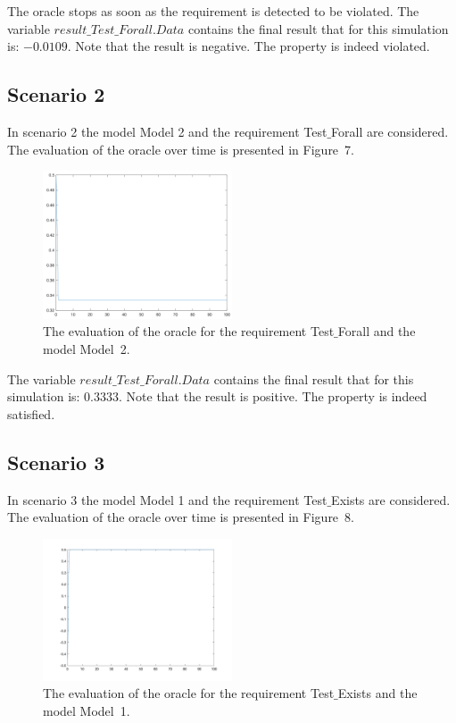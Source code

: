 \documentclass[12pt]{extarticle}
\newcommand{\<}{\langle}
\renewcommand{\>}{\rangle}
\theoremstyle{definition}
\begin{document}
The oracle stops as soon as the requirement is detected to be violated.
The variable  $result\_Test\_Forall.Data$  contains the final result that for this simulation is: $-0.0109$.
Note that the result is negative. 
The property is indeed violated.

\subsection{Scenario 2}
In scenario 2 the model Model 2 and the requirement Test$\_$Forall are considered. 
The evaluation of the oracle over time is presented in Figure~7.

\begin{figure}[h]
\caption{The evaluation of the oracle for the requirement Test$\_$Forall  and the model Model~2.}
  \centering
    \includegraphics[width=0.5\textwidth]{Manual/resModel2TestForall.png}
\end{figure}

The variable $result\_Test\_Forall.Data$ contains the final result that for this simulation is: $0.3333$.
Note that the result is positive.
The property is indeed satisfied.


\subsection{Scenario 3}
In scenario 3 the model Model 1 and the requirement Test$\_$Exists are considered. 
The evaluation of the oracle over time is presented in Figure~8.

\begin{figure}[h]
\caption{The evaluation of the oracle for the requirement Test$\_$Exists  and the model Model~1.}
  \centering
    \includegraphics[width=0.5\textwidth]{Manual/resModel1TestExists.png}
\end{figure}
\end{document}
